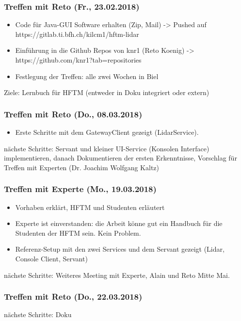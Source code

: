\subsubsection{Treffen mit Reto (Fr., 23.02.2018)}
\begin{itemize}
	\item Code für Java-GUI Software erhalten (Zip, Mail) -> Pushed auf https://gitlab.ti.bfh.ch/kilcm1/hftm-lidar
	\item Einführung in die Github Repos von knr1 (Reto Koenig) -> https://github.com/knr1?tab=repositories
	\item Festlegung der Treffen: alle zwei Wochen in Biel
\end{itemize}
Ziele: Lernbuch für HFTM (entweder in Doku integriert oder extern)


\subsubsection{Treffen mit Reto (Do., 08.03.2018)}
\begin{itemize}
	\item Erste Schritte mit dem GatewayClient gezeigt (LidarService).
\end{itemize}
nächste Schritte: Servant und kleiner UI-Service (Konsolen Interface) implementieren, danach Dokumentieren der ersten Erkenntnisse, Vorschlag für Treffen mit Experten (Dr. Joachim Wolfgang Kaltz)
\subsubsection{Treffen mit Experte (Mo., 19.03.2018)}
\begin{itemize}
	\item Vorhaben erklärt, HFTM und Studenten erläutert
	\item Experte ist einverstanden: die Arbeit könne gut ein Handbuch für die Studenten der HFTM sein. Kein Problem.
	\item Referenz-Setup mit den zwei Services und dem Servant gezeigt (Lidar, Console Client, Servant)
\end{itemize}
nächste Schritte: Weiteres Meeting mit Experte, Alain und Reto Mitte Mai.
\subsubsection{Treffen mit Reto (Do., 22.03.2018)}
nächste Schritte: Doku

